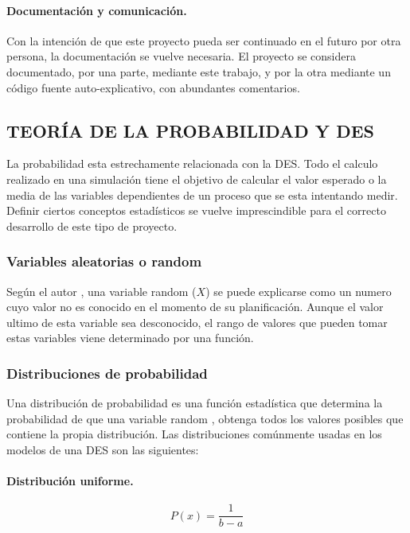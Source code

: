 \paragraph{Documentación y comunicación.}

Con la intención de que este proyecto
pueda ser continuado en el futuro por otra persona,
la documentación se vuelve necesaria.
El proyecto se considera documentado,
por una parte, mediante este trabajo,
y por la otra mediante un código fuente auto-explicativo,
con abundantes comentarios.

\subsection{TEORÍA DE LA PROBABILIDAD Y DES}

La probabilidad esta estrechamente relacionada con la DES.
Todo el calculo realizado en una simulación tiene el objetivo de
calcular el valor esperado o la media
de las variables dependientes de un proceso que se esta intentando medir.
Definir ciertos conceptos estadísticos se vuelve imprescindible
para el correcto desarrollo de este tipo de proyecto.

\subsubsection{Variables aleatorias o random}

Según el autor \citep{meester2008natural},
una variable random ($X$) se puede explicarse
como un numero cuyo valor no es conocido en el momento de su planificación.
Aunque el valor ultimo de esta variable sea desconocido,
el rango de valores que pueden tomar estas variables viene determinado por una función.
\subsubsection{Distribuciones de probabilidad}\label{sec_prob_dist}

Una distribución de probabilidad es una función estadística
que determina la probabilidad de que una variable random
\citep{simon2002probability},
obtenga todos los valores posibles que contiene la propia distribución.
Las distribuciones comúnmente usadas
en los modelos de una DES son las siguientes:

\paragraph{Distribución uniforme.}
\begin{equation}
	P(x) = \frac{1}{b-a}
\end{equation}

